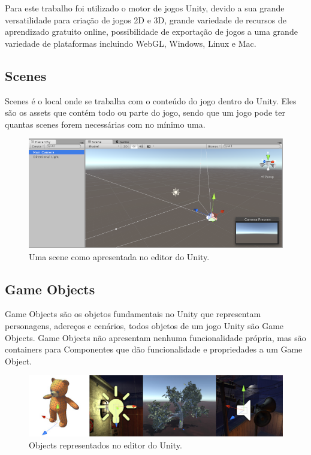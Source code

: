 \documentclass[
	12pt,				%
	openright,			%
	twoside,			%
	a4paper,			%
	english,			%
	french,				%
	spanish,			%
	brazil				%
	]{abntex2}
\begin{document}
	Para este trabalho foi utilizado o motor de jogos Unity, devido a sua grande versatilidade para criação de jogos 2D e 3D, grande variedade de recursos de aprendizado gratuito online,  possibilidade de exportação de jogos a uma grande variedade de plataformas incluindo WebGL, Windows, Linux e Mac. 

\subsection{Scenes}

Scenes é o local onde se trabalha com o conteúdo do jogo dentro do Unity. Eles são os assets que contém todo ou parte do jogo, sendo que um jogo pode ter quantas scenes forem necessárias com no mínimo uma.
\begin{figure}[h!]
  \includegraphics[width=\linewidth]{scene.jpg}
  \caption{Uma scene como apresentada no editor do Unity.}
  \label{fig:scene1}
\end{figure}
\pagebreak
\subsection{Game Objects}

Game Objects são os objetos fundamentais no Unity que representam personagens, adereços e cenários, todos objetos de um jogo Unity são Game Objects. Game Objects não apresentam nenhuma funcionalidade própria, mas são containers para Componentes que dão funcionalidade e propriedades a um Game Object.

\begin{figure}[h!]
  \includegraphics[width=\linewidth]{object.jpg}
  \caption{Objects representados no editor do Unity.}
  \label{fig:objects}
\end{figure}
\end{document}
